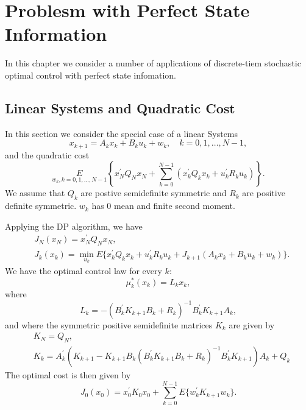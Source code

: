 \chapter{Problesm with Perfect State Information}
In this chapter we consider a number of applications of discrete-tiem stochastic optimal control with perfect state infomation.

\section{Linear Systems and Quadratic Cost}
In this section we consider the special case of a linear Systems
\begin{equation*}
    x_{k + 1} = A_k x_k + B_k u_k + w_k,\quad k = 0,1,\dots,N - 1,
\end{equation*}
and the quadratic cost \begin{equation*}
    \underset{w_k,k = 0,1,\dots,N - 1}{E}\left\{x_N^\prime Q_N x_N +\sum_{k = 0}^{N - 1}(x_k^\prime Q_k x_k + u_k^\prime R_k u_k) \right\}.
\end{equation*}
We assume that $Q_k$ are postive semidefinite symmetric and $R_k$ are positive definite symmetric. $w_k$ has 0 mean and finite second moment.

Applying the DP algorithm, we have 
\begin{align}
    &J_N(x_N) = x_N^\prime Q_N x_N,\nonumber\\
    &J_k(x_k) =\min_{u_k}E\{x_k^\prime Q_k x_k + u_k^\prime R_k u_k + J_{k + 1}(A_k x_k + B_k u_k + w_k)\}.
\end{align}
We have the optimal control law for every $k$:
\begin{equation}\label{eq:3.2}
    \mu_k^*(x_k) = L_k x_k,
\end{equation}
where 
\[L_k = -(B_k^\prime K_{k + 1}B_k + R_k)^{ - 1}B_k^\prime K_{k + 1} A_k,\] 
and where the symmetric positive semidefinite matrices $K_k$ are given by 
\begin{align}
    &K_N = Q_N,\\
    &K_k = A_k^\prime(K_{k + 1} - K_{k + 1}B_k(B_k^\prime K_{k + 1}B_k + R_k)^{ - 1}B_k^\prime K_{k + 1})A_k + Q_k \label{eq:3.4}
\end{align}
The optimal cost is then given by 
\[J_0 (x_0) = x_0^\prime K_0 x_0 + \sum_{k = 0}^{N - 1}E\{w_k^\prime K_{k + 1}w_k\}.\]

